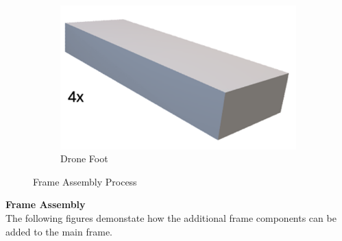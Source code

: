 \begin{figure}[H]
\begin{subfigure}[b]{0.3\textwidth}
    \end{subfigure}
    \vspace{0.5cm} 
    \begin{subfigure}[b]{0.25\textwidth}
        \centering
        \includegraphics[width=\textwidth]{img/assembly-5b.png}
        \caption{Drone Foot}
    \end{subfigure}
    \caption{Frame Assembly Process}
\end{figure}




\textbf{Frame Assembly} \\
The following figures demonstate how the additional frame components can be added to the main frame.

